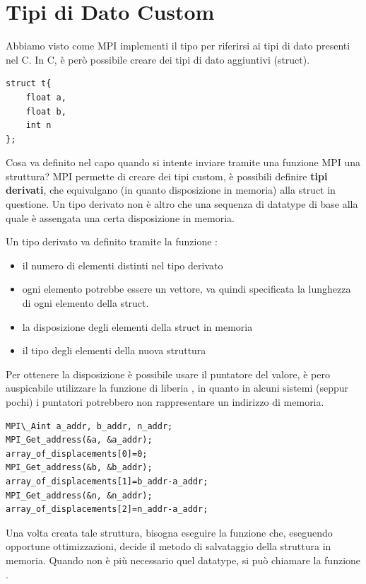 \documentclass[10pt, letterpaper]{report}
\begin{document}
\section{Tipi di Dato Custom}
Abbiamo visto come MPI implementi il tipo 
 per riferirsi ai tipi di dato presenti 
nel C. In C, è però possibile creare dei tipi di dato 
aggiuntivi (struct).
\begin{lstlisting}[style=CStyle]
struct t{
    float a,
    float b,
    int n
};
\end{lstlisting}
Cosa va definito nel capo  quando si 
intente inviare tramite una funzione MPI una struttura? 
MPI permette di creare dei tipi custom, è possibili 
definire \textbf{tipi derivati}, che equivalgano (in quanto 
disposizione in memoria) alla struct in questione. Un tipo 
derivato non è altro che una sequenza di 
datatype di base alla quale è assengata una certa 
disposizione in memoria. \begin{quote}
\end{quote}
Un tipo derivato va definito tramite la funzione 
:\begin{itemize}
    \item {} il numero di elementi distinti nel tipo derivato 
    \item {} ogni elemento potrebbe essere un vettore, va 
    quindi specificata la lunghezza di ogni elemento della struct.
    \item {} la disposizione degli elementi della 
    struct in memoria 
    \item {} il tipo degli elementi della nuova struttura  
\end{itemize}
Per ottenere la disposizione è possibile usare il puntatore del valore,  
è pero auspicabile utilizzare la funzione di liberia 
, in quanto in alcuni sistemi (seppur pochi) i puntatori potrebbero 
non rappresentare un indirizzo di memoria.
\begin{lstlisting}[style=CStyle]
MPI\_Aint a_addr, b_addr, n_addr;
MPI_Get_address(&a, &a_addr);
array_of_displacements[0]=0;
MPI_Get_address(&b, &b_addr);
array_of_displacements[1]=b_addr-a_addr;
MPI_Get_address(&n, &n_addr);
array_of_displacements[2]=n_addr-a_addr;
\end{lstlisting}
Una volta creata tale struttura, bisogna eseguire 
la funzione  che, eseguendo opportune ottimizzazioni,
 decide il metodo di salvataggio della struttura in memoria. 
 Quando non è più necessario quel datatype,
  si può chiamare la funzione .
\end{document}
